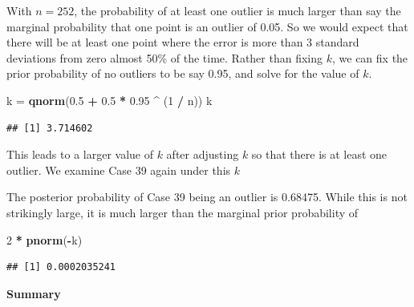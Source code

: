 \documentclass[]{book}
\newenvironment{Shaded}{\begin{snugshade}}{\end{snugshade}}
\newcommand{\KeywordTok}[1]{\textcolor[rgb]{0.13,0.29,0.53}{\textbf{#1}}}
\newcommand{\DecValTok}[1]{\textcolor[rgb]{0.00,0.00,0.81}{#1}}
\newcommand{\FloatTok}[1]{\textcolor[rgb]{0.00,0.00,0.81}{#1}}
\newcommand{\StringTok}[1]{\textcolor[rgb]{0.31,0.60,0.02}{#1}}
\newcommand{\CommentTok}[1]{\textcolor[rgb]{0.56,0.35,0.01}{\textit{#1}}}
\newcommand{\OperatorTok}[1]{\textcolor[rgb]{0.81,0.36,0.00}{\textbf{#1}}}
\newcommand{\NormalTok}[1]{#1}
\theoremstyle{definition}
\theoremstyle{definition}
\theoremstyle{definition}
\theoremstyle{remark}
\begin{document}
With \(n=252\), the probability of at least one outlier is much larger
than say the marginal probability that one point is an outlier of 0.05.
So we would expect that there will be at least one point where the error
is more than 3 standard deviations from zero almost 50\% of the time.
Rather than fixing \(k\), we can fix the prior probability of no
outliers to be say 0.95, and solve for the value of \(k\).

\begin{Shaded}
\begin{Highlighting}[]
\NormalTok{k =}\StringTok{ }\KeywordTok{qnorm}\NormalTok{(}\FloatTok{0.5} \OperatorTok{+}\StringTok{ }\FloatTok{0.5} \OperatorTok{*}\StringTok{ }\FloatTok{0.95} \OperatorTok{^}\StringTok{ }\NormalTok{(}\DecValTok{1} \OperatorTok{/}\StringTok{ }\NormalTok{n))}
\NormalTok{k}
\end{Highlighting}
\end{Shaded}

\begin{verbatim}
## [1] 3.714602
\end{verbatim}

This leads to a larger value of \(k\) after adjusting \(k\) so that
there is at least one outlier. We examine Case 39 again under this \(k\)

\begin{Shaded}
\end{Shaded}

The posterior probability of Case 39 being an outlier is 0.68475. While
this is not strikingly large, it is much larger than the marginal prior
probability of

\begin{Shaded}
\begin{Highlighting}[]
\DecValTok{2} \OperatorTok{*}\StringTok{ }\KeywordTok{pnorm}\NormalTok{(}\OperatorTok{-}\NormalTok{k)}
\end{Highlighting}
\end{Shaded}

\begin{verbatim}
## [1] 0.0002035241
\end{verbatim}

\textbf{Summary}
\end{document}
